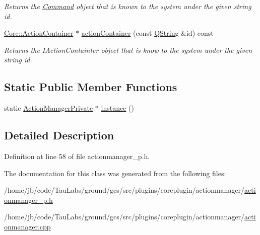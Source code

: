 \begin{DoxyCompactItemize}
\begin{DoxyCompactList}\small\item\em \-Returns the \hyperlink{class_core_1_1_command}{\-Command} object that is known to the system under the given string {\itshape id\/}. \end{DoxyCompactList}\item 
\hyperlink{class_core_1_1_action_container}{\-Core\-::\-Action\-Container} $\ast$ \hyperlink{group___core_plugin_gae0f296ea10c2a2f3f8c4b9595c10e8d0}{action\-Container} (const \hyperlink{group___u_a_v_objects_plugin_gab9d252f49c333c94a72f97ce3105a32d}{\-Q\-String} \&id) const 
\begin{DoxyCompactList}\small\item\em \-Returns the \-I\-Action\-Containter object that is know to the system under the given string {\itshape id\/}. \end{DoxyCompactList}\end{DoxyCompactItemize}
\subsection*{\-Static \-Public \-Member \-Functions}
\begin{DoxyCompactItemize}
\item 
static \hyperlink{class_core_1_1_internal_1_1_action_manager_private}{\-Action\-Manager\-Private} $\ast$ \hyperlink{group___core_plugin_ga2faf640c44a7165ba476bf75170af584}{instance} ()
\end{DoxyCompactItemize}


\subsection{\-Detailed \-Description}


\-Definition at line 58 of file actionmanager\-\_\-p.\-h.



\-The documentation for this class was generated from the following files\-:\begin{DoxyCompactItemize}
\item 
/home/jb/code/\-Tau\-Labs/ground/gcs/src/plugins/coreplugin/actionmanager/\hyperlink{actionmanager__p_8h}{actionmanager\-\_\-p.\-h}\item 
/home/jb/code/\-Tau\-Labs/ground/gcs/src/plugins/coreplugin/actionmanager/\hyperlink{actionmanager_8cpp}{actionmanager.\-cpp}\end{DoxyCompactItemize}

